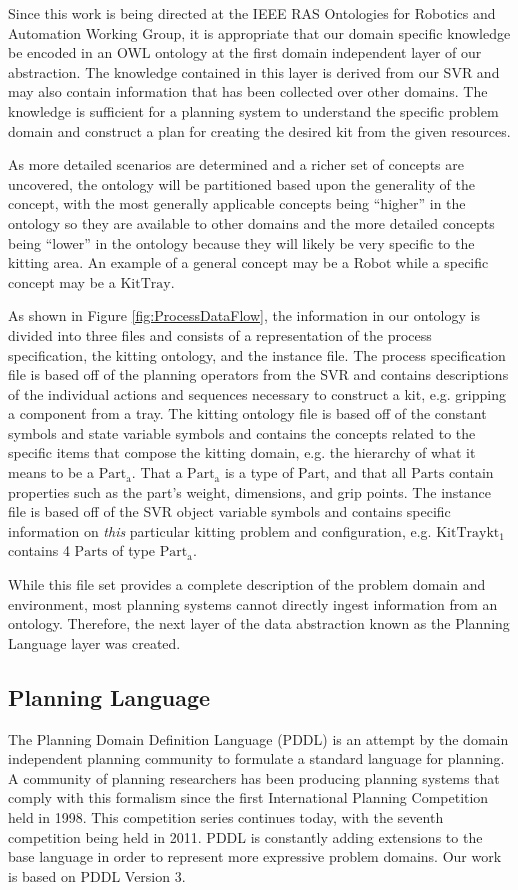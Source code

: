 \documentclass[a4paper, 10pt, conference]{ieeeconf}      %
\begin{document}
Since this work is being directed at the IEEE RAS Ontologies for Robotics and Automation Working Group, it is appropriate that our  domain specific knowledge  be
encoded in an OWL ontology at the first domain independent  layer of our abstraction. The knowledge contained in this layer is derived from our SVR and may also contain
information that has been collected over other domains. The knowledge is sufficient for a planning system to understand the specific problem domain and construct
a plan for creating the desired kit from the given resources.

As more detailed scenarios are determined and a richer set of concepts are uncovered, the ontology will be partitioned based upon the generality of the concept, with the most generally applicable concepts being ``higher'' in the ontology so they are available to other domains and the more detailed concepts being ``lower'' in the ontology because they will likely be very specific to the kitting area. An example of a general concept may be a $\mathrm{Robot}$ while a specific concept may be a $\mathrm{KitTray}$.

As shown in Figure \ref{fig:ProcessDataFlow}, the information in our ontology is divided into three files and consists of a representation of the process specification,
the kitting ontology, and the instance file. The process specification file is based off of the planning operators from the SVR and contains descriptions of
the individual actions and sequences necessary to construct a kit, e.g. gripping a component from a tray. The kitting ontology file is based off of the constant symbols and
state variable symbols and contains the concepts related to the specific items
that compose the kitting domain, e.g. the hierarchy of what it means to be a $\mathrm{Part_a}$. That a $\mathrm{Part_a}$ is a type of $\mathrm{Part}$, and that
all $\mathrm{Parts}$ contain properties such as the part's weight, dimensions, and grip points. The instance file is based off of the SVR object variable symbols and
contains specific information on {\it this} particular kitting problem and configuration, e.g. $\mathrm{KitTray kt_1}$ contains 4 $\mathrm{Parts}$ of type $\mathrm{Part_a}$.

While this file set provides a complete description of the problem domain and environment, most planning systems cannot directly ingest information from an ontology.
Therefore, the next layer of the data abstraction known as the Planning Language layer was created.

\subsection{Planning Language}
The Planning Domain Definition Language (PDDL) \cite{PDDL} is an attempt by the domain independent planning community to formulate a standard language for planning. A community
of planning researchers has been producing planning systems that comply with this formalism since the first International Planning Competition held in 1998. This competition series
continues today, with the seventh competition being held in 2011. PDDL is constantly adding extensions to the base language in order to represent more expressive problem domains. Our
work is based on PDDL Version  3.
\end{document}
